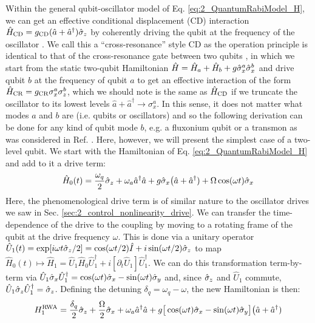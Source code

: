 Within the general qubit-oscillator model of Eq. \eqref{eq:2_QuantumRabiModel_H}, we can get an effective conditional displacement (CD) interaction $\hat{H}_{\rm CD} = g_{\rm CD}(\hat{a} + \hat{a}^\dagger)\hat{\sigma}_z$ by coherently driving the qubit at the frequency of the oscillator \cite{touzard2019gated}. We call this a ``cross-resonance'' style CD as the operation principle is identical to that of the cross-resonance gate between two qubits \cite{rigetti2010fully}, in which we start from the static two-qubit Hamiltonian $\hat{H} = \hat{H}_a + \hat{H}_b + g\hat{\sigma}_x^a\hat{\sigma}_x^b$ and drive qubit $b$ at the frequency of qubit $a$ to get an effective interaction of the form  $\hat{H}_{\rm CR} = g_{\rm CR}\sigma_x^a\sigma_z^b$, which we should note is the same as $\hat{H}_{\rm CD}$ if we truncate the oscillator to its lowest levels $\hat{a} + \hat{a}^\dagger \to \sigma_x^a$. In this sense, it does not matter what modes $a$ and $b$ are (i.e. qubits or oscillators) and so the following derivation can be done for any kind of qubit mode $b$, e.g. a fluxonium qubit or a transmon as was considered in Ref. \cite{touzard2019gated}. Here, however, we will present the simplest case of a two-level qubit. We start with the Hamiltonian of Eq. \eqref{eq:2_QuantumRabiModel_H} and add to it a drive term:
\begin{equation}
\hat{H}_0(t) = \frac{\omega_q}{2}\hat{\sigma}_z + \omega_a \hat{a}^\dagger \hat{a} + g\hat{\sigma}_x\big(\hat{a} + \hat{a}^\dagger) + \Omega \cos(\omega t)\hat{\sigma}_x
\label{eq:CR_CR_initial_eq}
\end{equation}
Here, the phenomenological drive term is of similar nature to the oscillator drives we saw in Sec. \ref{sec:2_control_nonlinearity_drive}. We can transfer the time-dependence of the drive to the coupling by moving to a rotating frame of the qubit at the drive frequency $\omega$. This is done via a unitary operator $\hat{U}_1(t) = \exp[i\omega t \hat{\sigma}_z / 2] = \cos(\omega t/2)\hat{I} +i\sin(\omega t/2)\hat{\sigma}_z$ to map $\hat{H}_0(t) \mapsto \hat{H}_1 = \hat{U}_1\hat{H}_0\hat{U}_1^\dagger + i[\partial_t \hat{U}_1]\hat{U}_1^\dagger$. We can do this transformation term-by-term  via $\hat{U}_1\hat{\sigma}_x\hat{U}_1^\dagger = \cos(\omega t)\hat{\sigma}_x - \sin(\omega t)\hat{\sigma}_y$ and, since $\hat{\sigma}_z$ and $\hat{U}_1$ commute, $\hat{U}_1\hat{\sigma}_z\hat{U}_1^\dagger = \hat{\sigma}_z$. Defining the detuning $\delta_q = \omega_q - \omega$, the new Hamiltonian is then: 
\begin{equation}
H_1^{\rm RWA} = \frac{\delta_q}{2}\hat{\sigma}_z + \frac{\Omega}{2}\hat{\sigma}_x + \omega_a \hat{a}^\dagger \hat{a} + g\big[\cos(\omega t)\hat{\sigma}_x - \sin(\omega t)\hat{\sigma}_y\big]\big(\hat{a} + \hat{a}^\dagger)
\end{equation}
